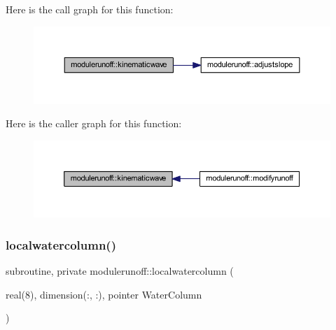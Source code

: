 Here is the call graph for this function\+:\nopagebreak
\begin{figure}[H]
\begin{center}
\leavevmode
\includegraphics[width=350pt]{namespacemodulerunoff_ac9ce40d4e0d4a7a1faa6f0a7fd6eca2f_cgraph}
\end{center}
\end{figure}
Here is the caller graph for this function\+:\nopagebreak
\begin{figure}[H]
\begin{center}
\leavevmode
\includegraphics[width=350pt]{namespacemodulerunoff_ac9ce40d4e0d4a7a1faa6f0a7fd6eca2f_icgraph}
\end{center}
\end{figure}
\mbox{\label{namespacemodulerunoff_abd7df3c244fbd0c4171c796df0f50906}} 
\subsubsection{\texorpdfstring{localwatercolumn()}{localwatercolumn()}}
{\footnotesize\ttfamily subroutine, private modulerunoff\+::localwatercolumn (\begin{DoxyParamCaption}\item[{real(8), dimension(\+:, \+:), pointer}]{Water\+Column }\end{DoxyParamCaption})\hspace{0.3cm}{\ttfamily [private]}}

